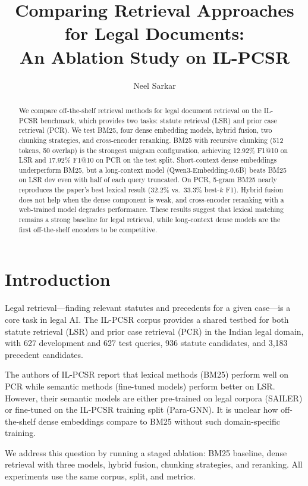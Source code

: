 \documentclass[11pt]{article}
\title{Comparing Retrieval Approaches for Legal Documents:\\
An Ablation Study on IL-PCSR}
\author{Neel Sarkar}
\date{}
\begin{document}
\maketitle

\begin{abstract}
We compare off-the-shelf retrieval methods for legal document retrieval on the IL-PCSR benchmark, which provides two tasks: statute retrieval (LSR) and prior case retrieval (PCR). We test BM25, four dense embedding models, hybrid fusion, two chunking strategies, and cross-encoder reranking. BM25 with recursive chunking (512 tokens, 50 overlap) is the strongest unigram configuration, achieving 12.92\% F1@10 on LSR and 17.92\% F1@10 on PCR on the test split. Short-context dense embeddings underperform BM25, but a long-context model (Qwen3-Embedding-0.6B) beats BM25 on LSR dev even with half of each query truncated. On PCR, 5-gram BM25 nearly reproduces the paper's best lexical result (32.2\% vs.\ 33.3\% best-$k$ F1). Hybrid fusion does not help when the dense component is weak, and cross-encoder reranking with a web-trained model degrades performance. These results suggest that lexical matching remains a strong baseline for legal retrieval, while long-context dense models are the first off-the-shelf encoders to be competitive.
\end{abstract}

\section{Introduction}

Legal retrieval---finding relevant statutes and precedents for a given case---is a core task in legal AI. The IL-PCSR corpus \cite{ilpcsr} provides a shared testbed for both statute retrieval (LSR) and prior case retrieval (PCR) in the Indian legal domain, with 627 development and 627 test queries, 936 statute candidates, and 3{,}183 precedent candidates.

The authors of IL-PCSR report that lexical methods (BM25) perform well on PCR while semantic methods (fine-tuned models) perform better on LSR. However, their semantic models are either pre-trained on legal corpora (SAILER) or fine-tuned on the IL-PCSR training split (Para-GNN). It is unclear how off-the-shelf dense embeddings compare to BM25 without such domain-specific training.

We address this question by running a staged ablation: BM25 baseline, dense retrieval with three models, hybrid fusion, chunking strategies, and reranking. All experiments use the same corpus, split, and metrics.
\end{document}
